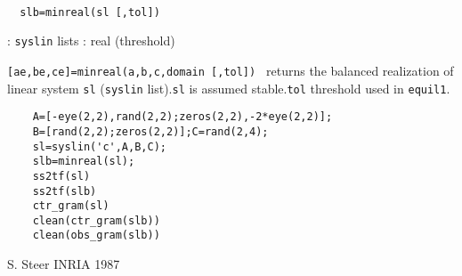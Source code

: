 \begin{mandesc}
   \\ %
\end{mandesc}
\begin{calling_sequence}
\begin{verbatim}
  slb=minreal(sl [,tol])  
\end{verbatim}
\end{calling_sequence}
\begin{parameters}
  \begin{varlist}
    : \verb!syslin! lists
    : real (threshold)
  \end{varlist}
\end{parameters}
\begin{mandescription}
  \verb![ae,be,ce]=minreal(a,b,c,domain [,tol]) !  returns the balanced
  realization of linear system \verb!sl! (\verb!syslin! list).\verb!sl! is
  assumed stable.\verb!tol! threshold used in \verb!equil1!.
\end{mandescription}
\begin{examples}
  \begin{Verbatim}
    A=[-eye(2,2),rand(2,2);zeros(2,2),-2*eye(2,2)];
    B=[rand(2,2);zeros(2,2)];C=rand(2,4);
    sl=syslin('c',A,B,C);
    slb=minreal(sl);
    ss2tf(sl)
    ss2tf(slb)
    ctr_gram(sl)
    clean(ctr_gram(slb))
    clean(obs_gram(slb))
  \end{Verbatim}
\end{examples}
\begin{manseealso}
        
\end{manseealso}
\begin{authors}
  S. Steer INRIA 1987
\end{authors}
